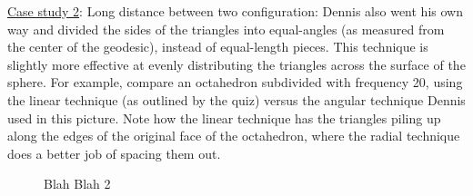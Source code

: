 \noindent\uline{Case study 2}: Long distance between two configuration:
Dennis also went his own way and divided the sides of the triangles into equal-angles (as measured from the center of the geodesic), instead of equal-length pieces. This technique is slightly more effective at evenly distributing the triangles across the surface of the sphere. For example, compare an octahedron subdivided with frequency 20, using the linear technique (as outlined by the quiz) versus the angular technique Dennis used in this picture. Note how the linear technique has the triangles piling up along the edges of the original face of the octahedron, where the radial technique does a better job of spacing them out.
\begin{center}
\begin{figure}[h]
\hfill
{}
\caption{Blah Blah 2}
\end{figure}
\end{center}

